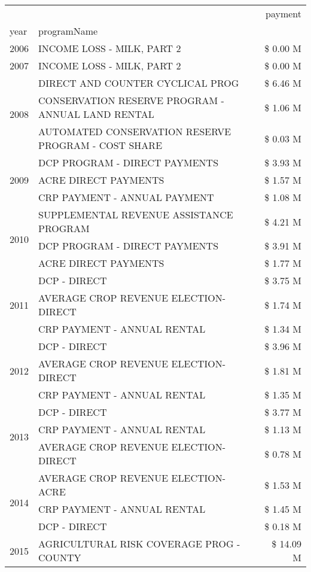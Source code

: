 \begin{tabular}{llr}
\toprule
 &  & payment \\
year & programName &  \\
\midrule
2006 & INCOME LOSS - MILK, PART 2 & \$ 0.00 M \\
\cline{1-3}
2007 & INCOME LOSS - MILK, PART 2 & \$ 0.00 M \\
\cline{1-3}
\multirow[t]{3}{*}{2008} & DIRECT AND COUNTER CYCLICAL PROG & \$ 6.46 M \\
 & CONSERVATION RESERVE PROGRAM - ANNUAL LAND RENTAL & \$ 1.06 M \\
 & AUTOMATED CONSERVATION RESERVE PROGRAM - COST SHARE & \$ 0.03 M \\
\cline{1-3}
\multirow[t]{3}{*}{2009} & DCP PROGRAM - DIRECT PAYMENTS & \$ 3.93 M \\
 & ACRE DIRECT PAYMENTS & \$ 1.57 M \\
 & CRP PAYMENT - ANNUAL PAYMENT & \$ 1.08 M \\
\cline{1-3}
\multirow[t]{3}{*}{2010} & SUPPLEMENTAL REVENUE ASSISTANCE PROGRAM & \$ 4.21 M \\
 & DCP PROGRAM - DIRECT PAYMENTS & \$ 3.91 M \\
 & ACRE DIRECT PAYMENTS & \$ 1.77 M \\
\cline{1-3}
\multirow[t]{3}{*}{2011} & DCP - DIRECT & \$ 3.75 M \\
 & AVERAGE CROP REVENUE ELECTION-DIRECT & \$ 1.74 M \\
 & CRP PAYMENT - ANNUAL RENTAL & \$ 1.34 M \\
\cline{1-3}
\multirow[t]{3}{*}{2012} & DCP - DIRECT & \$ 3.96 M \\
 & AVERAGE CROP REVENUE ELECTION-DIRECT & \$ 1.81 M \\
 & CRP PAYMENT - ANNUAL RENTAL & \$ 1.35 M \\
\cline{1-3}
\multirow[t]{3}{*}{2013} & DCP - DIRECT & \$ 3.77 M \\
 & CRP PAYMENT - ANNUAL RENTAL & \$ 1.13 M \\
 & AVERAGE CROP REVENUE ELECTION-DIRECT & \$ 0.78 M \\
\cline{1-3}
\multirow[t]{3}{*}{2014} & AVERAGE CROP REVENUE ELECTION-ACRE & \$ 1.53 M \\
 & CRP PAYMENT - ANNUAL RENTAL & \$ 1.45 M \\
 & DCP - DIRECT & \$ 0.18 M \\
\cline{1-3}
\multirow[t]{3}{*}{2015} & AGRICULTURAL RISK COVERAGE PROG - COUNTY & \$ 14.09 M \\

\end{tabular}
